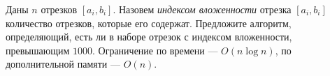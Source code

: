 \documentclass{article}
\begin{document}
Даны $n$ отрезков $[a_i, b_i]$. Назовем \textit{индексом вложенности} отрезка $[a_i,b_i]$ количество отрезков, которые его содержат.
Предложите алгоритм, определяющий, есть ли в наборе отрезок с индексом вложенности, превышающим $1000$. Ограничение по времени --- $O(n \log n)$, по дополнительной памяти --- $O(n)$.
\end{document}
